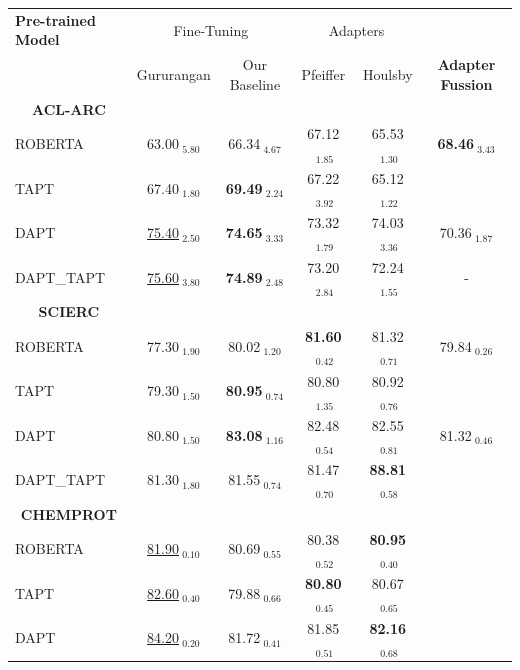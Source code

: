 \documentclass[draft,10pt,twocolumn,letterpaper]{article}
\begin{document}
\begin{table}[h]
    \centering
    \label{table:aclarc}
    \begin{tabular}{@{}lcc|cc|c@{}}
    \toprule
    \textbf{Pre-trained Model} & \multicolumn{2}{c|}{Fine-Tuning} & \multicolumn{2}{c}{Adapters} \\
    \cmidrule(lr){2-3} \cmidrule(lr){4-5}
    & Gururangan & Our Baseline & Pfeiffer & Houlsby & \textbf{Adapter Fussion}  \\
    \midrule
    \multicolumn{1}{c}{\textbf{ACL-ARC}} \\
    ROBERTA & 63.00$_{\text{ 5.80}}$ & 66.34$_{\text{ 4.67}}$ & 67.12$_{\text{ 1.85}}$ & 65.53$_{\text{ 1.30}}$ & \textbf{68.46}$_{\text{ 3.43}}$ \\ 
    TAPT & 67.40$_{\text{ 1.80}}$ & \textbf{69.49}$_{\text{ 2.24}}$ & 67.22$_{\text{ 3.92}}$ & 65.12$_{\text{ 1.22}}$ &  \\ 
    DAPT & \underline{75.40}$_{\text{ 2.50}}$ & \textbf{74.65}$_{\text{ 3.33}}$ & 73.32$_{\text{ 1.79}}$ & 74.03$_{\text{ 3.36}}$ & 70.36$_{\text{ 1.87}}$ \\ 
    DAPT\_TAPT & \underline{75.60}$_{\text{ 3.80}}$ & \textbf{74.89}$_{\text{ 2.48}}$ & 73.20$_{\text{ 2.84}}$ & 72.24$_{\text{ 1.55}}$ & -\\ 
    \midrule
    \multicolumn{1}{c}{\textbf{SCIERC}} \\
    ROBERTA & 77.30$_{\text{ 1.90}}$ & 80.02$_{\text{ 1.20}}$ & \textbf{81.60}$_{\text{ 0.42}}$ & 81.32$_{\text{ 0.71}}$ & 79.84$_{\text{ 0.26}}$ \\ 
    TAPT & 79.30$_{\text{ 1.50}}$ & \textbf{80.95}$_{\text{ 0.74}}$ & 80.80$_{\text{ 1.35}}$ & 80.92$_{\text{ 0.76}}$ &  \\ 
    DAPT & 80.80$_{\text{ 1.50}}$ & \textbf{83.08}$_{\text{ 1.16}}$ & 82.48$_{\text{ 0.54}}$ & 82.55$_{\text{ 0.81}}$ & 81.32$_{\text{ 0.46}}$ \\ 
    DAPT\_TAPT & 81.30$_{\text{ 1.80}}$ & 81.55$_{\text{ 0.74}}$ & 81.47$_{\text{ 0.70}}$ & \textbf{88.81}$_{\text{ 0.58}}$ &  \\ 
    \midrule
    \multicolumn{1}{c}{\textbf{CHEMPROT}} \\
    ROBERTA & \underline{81.90}$_{\text{ 0.10}}$ & 80.69$_{\text{ 0.55}}$ & 80.38$_{\text{ 0.52}}$ & \textbf{80.95}$_{\text{ 0.40}}$ &  \\ 
    TAPT & \underline{82.60}$_{\text{ 0.40}}$ & 79.88$_{\text{ 0.66}}$ & \textbf{80.80}$_{\text{ 0.45}}$ & 80.67$_{\text{ 0.65}}$ &  \\ 
    DAPT & \underline{84.20}$_{\text{ 0.20}}$ & 81.72$_{\text{ 0.41}}$ & 81.85$_{\text{ 0.51}}$ & \textbf{82.16}$_{\text{ 0.68}}$ &  \\ 

\end{tabular}
\end{table}
\end{document}
